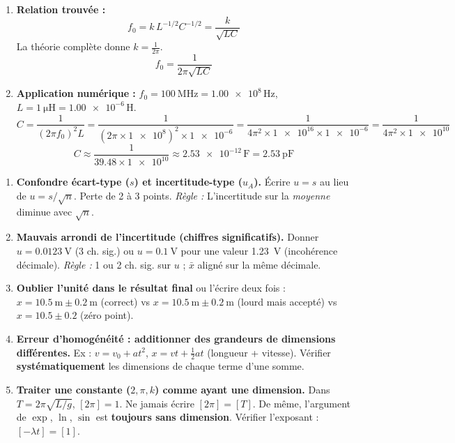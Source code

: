 \documentclass[11pt]{article}
\begin{document}
\begin{exoresolu}
\begin{enumerate}
\[\begin{cases}
              \end{cases}\]
              Donc $a = b = -1/2$.
        \item \textbf{Relation trouvée :}
              \[ f_0 = k \, L^{-1/2} C^{-1/2} = \frac{k}{\sqrt{LC}} \]
              La théorie complète donne $k = \frac{1}{2\pi}$.
              \[ \boxed{f_0 = \frac{1}{2\pi\sqrt{LC}}} \]
        \item \textbf{Application numérique :}
              $f_0 = \SI{100}{\mega\hertz} = \num{1,00e8}\,\si{\hertz}$, $L = \SI{1}{\micro\henry} = \num{1,00e-6}\,\si{\henry}$.
              \[ C = \frac{1}{(2\pi f_0)^2 L} = \frac{1}{(2\pi \times \num{1e8})^2 \times \num{1e-6}} = \frac{1}{4\pi^2 \times \num{1e16} \times \num{1e-6}} = \frac{1}{4\pi^2 \times \num{1e10}} \]
              \[ C \approx \frac{1}{\num{39,48} \times \num{1e10}} \approx \num{2,53e-12}\,\si{\farad} = \boxed{\SI{2,53}{\pico\farad}} \]
    \end{enumerate}
\end{exoresolu}

\begin{attention}
    \begin{enumerate}
        \item \textbf{Confondre écart-type ($s$) et incertitude-type ($u_A$).}
              Écrire $u = s$ au lieu de $u = s/\sqrt{n}$. Perte de 2 à 3 points. \emph{Règle :} L'incertitude sur la \emph{moyenne} diminue avec $\sqrt{n}$.
        \item \textbf{Mauvais arrondi de l'incertitude (chiffres significatifs).}
              Donner $u = \SI{0,0123}{\volt}$ (3 ch. sig.) ou $u = \SI{0,1}{\volt}$ pour une valeur \SI{1,23}{\volt} (incohérence décimale).
              \emph{Règle :} 1 ou 2 ch. sig. sur $u$ ; $\bar{x}$ aligné sur la même décimale.
        \item \textbf{Oublier l'unité dans le résultat final} ou l'écrire deux fois : $x = \SI{10,5}{\meter} \pm \SI{0,2}{\meter}$ (correct) vs $x = \SI{10,5}{\meter} \pm \SI{0,2}{\meter}$ (lourd mais accepté) vs $x = \num{10,5} \pm \num{0,2}$ (zéro point).
        \item \textbf{Erreur d'homogénéité : additionner des grandeurs de dimensions différentes.}
              Ex : $v = v_0 + at^2$, $x = vt + \frac{1}{2}at$ (longueur + vitesse). Vérifier \textbf{systématiquement} les dimensions de chaque terme d'une somme.
        \item \textbf{Traiter une constante ($2, \pi, k$) comme ayant une dimension.}
              Dans $T = 2\pi\sqrt{L/g}$, $[2\pi]=1$. Ne jamais écrire $[2\pi]=[T]$. De même, l'argument de $\exp$, $\ln$, $\sin$ est \textbf{toujours sans dimension}. Vérifier l'exposant : $[-\lambda t] = [1]$.
    \end{enumerate}
\end{attention}
\end{document}
